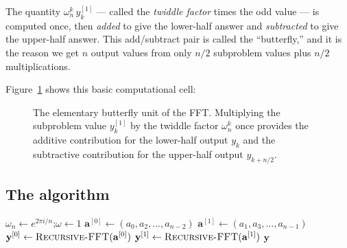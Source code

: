 \begin{intuitionbox}
The quantity $\omega_n^k\, y^{[1]}_k$ --- called
the \emph{twiddle factor} times the odd value --- is computed once, then \emph{added}
to give the lower-half answer and \emph{subtracted} to give the upper-half answer.
This add/subtract pair is called the ``butterfly,'' and it is the reason we get $n$
output values from only $n/2$ subproblem values plus $n/2$ multiplications.
\end{intuitionbox}

Figure~\ref{ch29:fig-butterfly-unit} shows this basic computational cell:

\begin{figure}[H]
\centering
{}
\caption{The elementary butterfly unit of the FFT. Multiplying the subproblem value
$y^{[1]}_k$ by the twiddle factor $\omega_n^k$ once provides the additive contribution
for the lower-half output $y_k$ and the subtractive contribution for the upper-half
output $y_{k+n/2}$.}
\label{ch29:fig-butterfly-unit}
\end{figure}

\subsection{The algorithm}

\begin{algorithm}[H]
\caption{\textsc{Recursive-FFT}$(\mathbf{a})$}
$\omega_n \gets e^{2\pi i / n}$;\quad $\omega \gets 1$\;
$\mathbf{a}^{[0]} \gets (a_0, a_2, \dots, a_{n-2})$\;
$\mathbf{a}^{[1]} \gets (a_1, a_3, \dots, a_{n-1})$\;
$\mathbf{y}^{[0]} \gets \textsc{Recursive-FFT}(\mathbf{a}^{[0]})$\;
$\mathbf{y}^{[1]} \gets \textsc{Recursive-FFT}(\mathbf{a}^{[1]})$\;
\Return $\mathbf{y}$\;
\end{algorithm}

